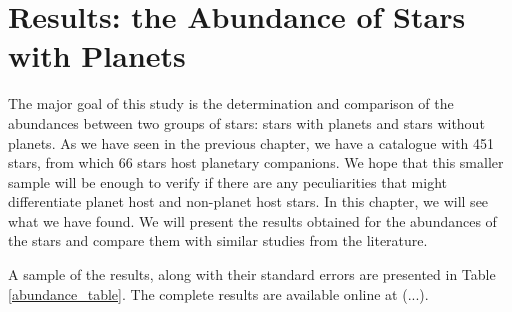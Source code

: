 \documentclass[dvips,12pt,a4paper]{report}
\begin{document}
{{%
\chapter{Results: the Abundance of Stars with Planets}


The major goal of this study is the determination and comparison of the abundances between two groups of stars: stars with planets and stars without planets. As we have seen in the previous chapter, we have a catalogue with 451 stars, from which 66 stars host planetary companions. We hope that this smaller sample will be enough to verify if there are any peculiarities that might differentiate planet host and non-planet host stars. In this chapter, we will see what we have found. We will present the results obtained for the abundances of the stars and compare them with similar studies from the literature.

A sample of the results, along with their standard errors are presented in Table \ref{abundance_table}. The complete results are available online at (...). 



}}
\end{document}
